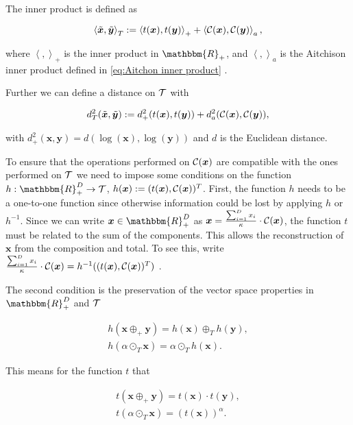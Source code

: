 The inner product is defined as 

\begin{equation}
\left\langle \tilde{\bm{x}},\tilde{\bm{y}} \right\rangle_T := \left\langle t(\bm{x}),t(\bm{y}) \right\rangle_+ + \left\langle \mathcal{C}(\bm{x}),\mathcal{C}(\bm{y}) \right\rangle_a,
\label{eq:inner product Tspace}
\end{equation}

where $\left\langle ,\right\rangle_+$ is the inner product in $\mathbbm{R}_+$, and $\left\langle ,\right\rangle_a$ is the Aitchison inner product defined in \ref{eq:Aitchon inner product} \cite{Pawlowsky:2013}.

Further we can define a distance on $\mathcal{T}$ with 

\begin{gather}
d_T^2(\tilde{\bm{x}},\tilde{\bm{y}}) := d_+^2(t(\bm{x}),t(\bm{y})) + d_a^2(\mathcal{C}(\bm{x}),\mathcal{C}(\bm{y})),
\label{eq:distance Tspace}
\end{gather}

with $d_+^2(\bm{x},\bm{y}) = d(\log(\bm{x}),\log(\bm{y}))$ and $d$ is the Euclidean distance. 

To ensure that the operations performed on $\mathcal{C}(\bm{x})$ are compatible with the ones performed on $\mathcal{T}$ we need to impose some conditions on the function $h:\mathbbm{R}_+^D \rightarrow \Tsp$, $h(\bm{x}):=(t(\bm{x}),\mathcal{C}(\bm{x}))^T$. First, the function $h$ needs to be a one-to-one function since otherwise information could be lost by applying $h$ or $h^{-1}$. Since we can write $\bm{x} \in \mathbbm{R}_+^D$ as $\bm{x} = \frac{\sum_{i=1}^D x_i}{\kappa} \cdot \mathcal{C}(\bm{x})$, the function $t$ must be related to the sum of the components. This allows the reconstruction of $\bm{x}$ from the composition and total. To see this, write $ \frac{\sum_{i=1}^D x_i}{\kappa} \cdot \mathcal{C}(\bm{x}) = h^{-1}((t(\bm{x}),\mathcal{C}(\bm{x}))^T)$ \cite{Pawlowsky:2013}. 

The second condition is the preservation of the vector space properties in $\mathbbm{R}_+^D$ and $\mathcal{T}$

\begin{gather}
h(\bm{x} \oplus_+ \bm{y}) = h(\bm{x}) \oplus_T h(\bm{y}), \\
h(\alpha \odot_T \bm{x}) = \alpha \odot_T h(\bm{x}). 
\label{eq:Vector Space Properties}
\end{gather}

This means for the function $t$ that 

\begin{gather}
t(\bm{x} \oplus_+ \bm{y}) = t(\bm{x}) \cdot t(\bm{y}), \\
t(\alpha \odot_T \bm{x}) = (t(\bm{x}))^{\alpha}. 
\label{eq:Vector Space Properties for t}
\end{gather}

